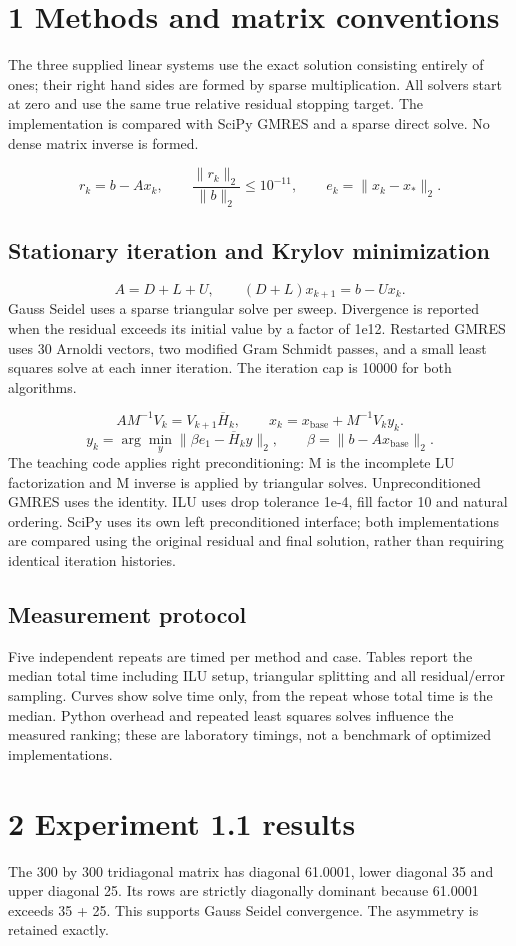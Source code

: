 \documentclass[a4paper,11pt]{article}
\begin{document}
\section*{1 Methods and matrix conventions}
The three supplied linear systems use the exact solution consisting entirely of ones; their right hand sides are formed by sparse multiplication. All solvers start at zero and use the same true relative residual stopping target. The implementation is compared with SciPy GMRES and a sparse direct solve. No dense matrix inverse is formed.

\[r_k=b-Ax_k,\qquad \frac{\|r_k\|_2}{\|b\|_2}\leq 10^{-11},\qquad e_k=\|x_k-x_*\|_2.\]
\subsection*{Stationary iteration and Krylov minimization}
\[A=D+L+U,\qquad (D+L)x_{k+1}=b-Ux_k.\]
Gauss Seidel uses a sparse triangular solve per sweep. Divergence is reported when the residual exceeds its initial value by a factor of 1e12. Restarted GMRES uses 30 Arnoldi vectors, two modified Gram Schmidt passes, and a small least squares solve at each inner iteration. The iteration cap is 10000 for both algorithms.

\[AM^{-1}V_k=V_{k+1}\overline{H}_k,\qquad x_k=x_{\mathrm{base}}+M^{-1}V_ky_k.\]
\[y_k=\arg\min_y\|\beta e_1-\overline{H}_ky\|_2,\qquad \beta=\|b-Ax_{\mathrm{base}}\|_2.\]
The teaching code applies right preconditioning: M is the incomplete LU factorization and M inverse is applied by triangular solves. Unpreconditioned GMRES uses the identity. ILU uses drop tolerance 1e-4, fill factor 10 and natural ordering. SciPy uses its own left preconditioned interface; both implementations are compared using the original residual and final solution, rather than requiring identical iteration histories.

\subsection*{Measurement protocol}
Five independent repeats are timed per method and case. Tables report the median total time including ILU setup, triangular splitting and all residual/error sampling. Curves show solve time only, from the repeat whose total time is the median. Python overhead and repeated least squares solves influence the measured ranking; these are laboratory timings, not a benchmark of optimized implementations.

\clearpage
\section*{2 Experiment 1.1 results}
The 300 by 300 tridiagonal matrix has diagonal 61.0001, lower diagonal 35 and upper diagonal 25. Its rows are strictly diagonally dominant because 61.0001 exceeds 35 + 25. This supports Gauss Seidel convergence. The asymmetry is retained exactly.
\end{document}
